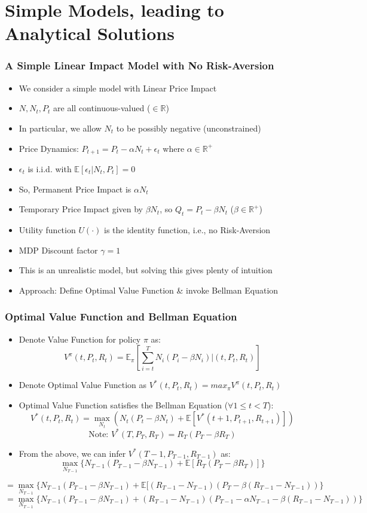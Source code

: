 \documentclass[handout]{beamer}
\begin{document}
\section{Simple Models, leading to Analytical Solutions}

\begin{frame}
\frametitle{A Simple Linear Impact Model with No Risk-Aversion}
\pause
\begin{itemize}[<+->]
\item We consider a simple model with Linear Price Impact
\item $N, N_t, P_t$ are all continuous-valued ($\in \mathbb{R}$)
\item In particular, we allow $N_t$ to be possibly negative (unconstrained)
\item Price Dynamics: $P_{t+1} = P_t - \alpha N_t + \epsilon_t$ where $\alpha \in \mathbb{R}^+$
\item $\epsilon_t$ is i.i.d. with $\mathbb{E}[\epsilon_t|N_t, P_t] = 0$
\item So, Permanent Price Impact is $\alpha N_t$
\item Temporary Price Impact given by $\beta N_t$, so $Q_t = P_t - \beta N_t$ ($\beta \in \mathbb{R}^+$)
\item Utility function $U(\cdot)$ is the identity function, i.e., no Risk-Aversion
\item MDP Discount factor $\gamma = 1$
\item This is an unrealistic model, but solving this gives plenty of intuition
\item Approach: Define Optimal Value Function \& invoke Bellman Equation
\end{itemize}
\end{frame}

\begin{frame}
\frametitle{Optimal Value Function and Bellman Equation}
\pause
\begin{itemize}
\item Denote Value Function for policy $\pi$ as: $$V^{\pi}(t, P_t, R_t) = \mathbb{E}_{\pi}[\sum_{i=t}^T N_i (P_i - \beta N_i)|(t,P_t,R_t)]$$
\pause
\item Denote Optimal Value Function as $V^*(t,P_t,R_t) = max_{\pi} V^{\pi}(t,P_t,R_t)$
\pause
\item Optimal Value Function satisfies the Bellman Equation ($\forall 1 \leq t < T$):
$$V^*(t,P_t,R_t) = \max_{N_t} (N_t(P_t - \beta N_t)  + \mathbb{E}[V^*(t+1, P_{t+1}, R_{t+1})])$$
\pause
$$\mbox{Note: } V^*(T, P_T,R_T) = R_T(P_T - \beta R_T)$$
\item From the above, we can infer $V^*(T-1,P_{T-1},R_{T-1})$ as:
$$\max_{N_{T-1}} \{ N_{T-1}(P_{T-1} - \beta N_{T-1})  + \mathbb{E}[R_T(P_T - \beta R_T)] \}$$
\end{itemize}
$$=\max_{N_{T-1}} \{ N_{T-1}(P_{T-1} - \beta N_{T-1})  + \mathbb{E}[(R_{T-1} - N_{T-1})(P_T - \beta(R_{T-1} - N_{T-1})) \}$$
$$=\max_{N_{T-1}} \{ N_{T-1}(P_{T-1} - \beta N_{T-1})  + (R_{T-1} - N_{T-1})(P_{T-1} - \alpha N_{T-1} - \beta(R_{T-1} - N_{T-1})) \}$$
\end{frame}
\end{document}
